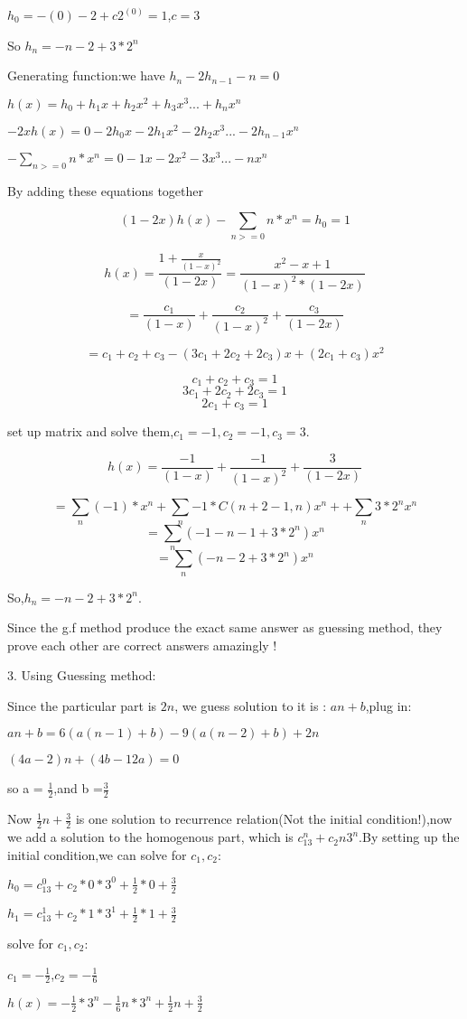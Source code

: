 \documentclass{article}
\begin{document}
$h_0=-(0)-2+c2^{(0)}=1$,$c=3$

So $h_n = -n-2+3*2^n$

Generating function:we have $h_n-2h_{n-1}-n=0$

$h(x) = h_0+h_1x+h_2x^2+h_3x^3...+h_nx^n$

$-2xh(x) = 0-2h_0x-2h_1x^2-2h_2x^3...-2h_{n-1}x^n$

$-\sum_{n>=0}n*x^n = 0-1x-2x^2-3x^3...-nx^n$

By adding these equations together

$$(1-2x)h(x)-\sum_{n>=0}n*x^n = h_0 = 1$$

$$h(x)=\frac{1+\frac{x}{{(1-x)}^2}}{(1-2x)}=\frac{x^2-x+1}{(1-x)^2*(1-2x)}$$

$$=\frac{c_1}{(1-x)}+\frac{c_2}{(1-x)^2}+\frac{c_3}{(1-2x)}$$

$$=c_1+c_2+c_3-(3c_1+2c_2+2c_3)x+(2c_1+c_3)x^2$$

$$c_1+c_2+c_3=1$$
$$3c_1+2c_2+2c_3=1$$
$$2c_1+c_3=1$$

set up matrix and solve them,$c_1=-1,c_2=-1,c_3=3$.

$$h(x)=\frac{-1}{(1-x)}+\frac{{-1}}{(1-x)^2}+\frac{3}{(1-2x)}$$

$$=\sum_n(-1)*x^n+\sum_n{-1}*C(n+2-1,n)x^n++\sum_n3*2^nx^n$$
$$=\sum_n(-1-n-1+3*2^n)x^n$$
$$=\sum_n(-n-2+3*2^n)x^n$$

So,$h_n = -n-2+3*2^n $.

Since the g.f method produce the exact same answer as guessing method, they prove each other are correct answers amazingly !


3.
Using Guessing method:

Since the particular part is $2n$, we guess solution to it is :
$an+b$,plug in:

$an+b=6(a(n-1)+b)-9(a(n-2)+b)+2n$

$(4a − 2)n + (4b − 12a) = 0$

so a = $\frac{1}{2}$,and b =$\frac{3}{2}$


Now $\frac{1}{2}n+\frac{3}{2}$ is one solution to recurrence relation(Not the initial condition!),now we add a solution to the homogenous part, which is $c_13^n + c_2n3^n$.By setting up the initial condition,we can solve for $c_1,c_2$:

$h_0 = c_13^0 + c_2*0*3^0 + \frac{1}{2}*0+\frac{3}{2}$

$h_1 = c_13^1 + c_2*1*3^1 + \frac{1}{2}*1+\frac{3}{2}$

solve for $c_1,c_2$:

$c_1=-\frac{1}{2}$,$c_2=-\frac{1}{6}$

$h(x)=-\frac{1}{2}*3^n-\frac{1}{6}n*3^n+\frac{1}{2}n+\frac{3}{2}$
\end{document}

